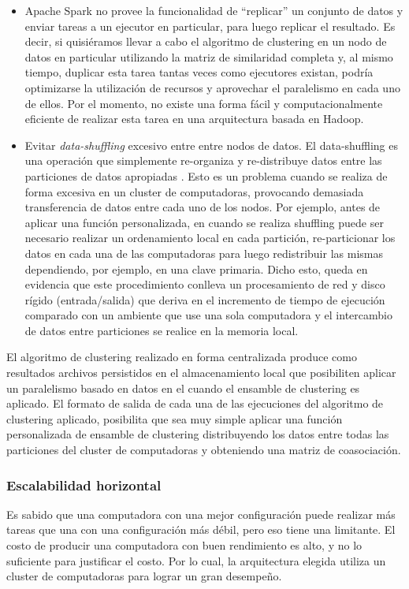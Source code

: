 \begin{itemize}
	\item Apache Spark no provee la funcionalidad de “replicar” un conjunto de datos y enviar tareas a un ejecutor en particular, para luego replicar el resultado. Es decir, si quisiéramos llevar a cabo el algoritmo de clustering en un nodo de datos en particular utilizando la matriz de similaridad completa y, al mismo tiempo, duplicar esta tarea tantas veces como ejecutores existan, podría optimizarse la utilización de recursos y aprovechar el paralelismo en cada uno de ellos. Por el momento, no existe una forma fácil y computacionalmente eficiente de realizar esta tarea en una arquitectura basada en Hadoop.
	\item Evitar \textit{data-shuffling} excesivo entre entre nodos de datos. El data-shuffling es una operación que simplemente re-organiza y re-distribuye datos entre las particiones de datos apropiadas \citep{zhang2012optimizing}. Esto es un problema cuando se realiza de forma excesiva en un cluster de computadoras, provocando demasiada transferencia de datos entre cada uno de los nodos. Por ejemplo, antes de aplicar una función personalizada, en cuando se realiza shuffling puede ser necesario realizar un ordenamiento local en cada partición, re-particionar los datos en cada una de las computadoras para luego redistribuir las mismas dependiendo, por ejemplo, en una clave primaria. Dicho esto, queda en evidencia que este procedimiento conlleva un procesamiento de red y disco rígido (entrada/salida) que deriva en el incremento de tiempo de ejecución comparado con un ambiente que use una sola computadora y el intercambio de datos entre particiones se realice en la memoria local.
\end{itemize}

El algoritmo de clustering realizado en forma centralizada produce como resultados archivos persistidos en el almacenamiento local que posibiliten aplicar un paralelismo basado en datos en el cuando el ensamble de clustering es aplicado. El formato de salida de cada una de las ejecuciones del algoritmo de clustering aplicado, posibilita que sea muy simple aplicar una función personalizada de ensamble de clustering distribuyendo los datos entre todas las particiones del cluster de computadoras y obteniendo una matriz de coasociación.

\subsubsection{Escalabilidad horizontal}
Es sabido que una computadora con una mejor configuración puede realizar más tareas que una con una configuración más débil, pero eso tiene una limitante. El costo de producir una computadora con buen rendimiento es alto, y no lo suficiente para justificar el costo. Por lo cual, la arquitectura elegida utiliza un cluster de computadoras para lograr un gran desempeño.

